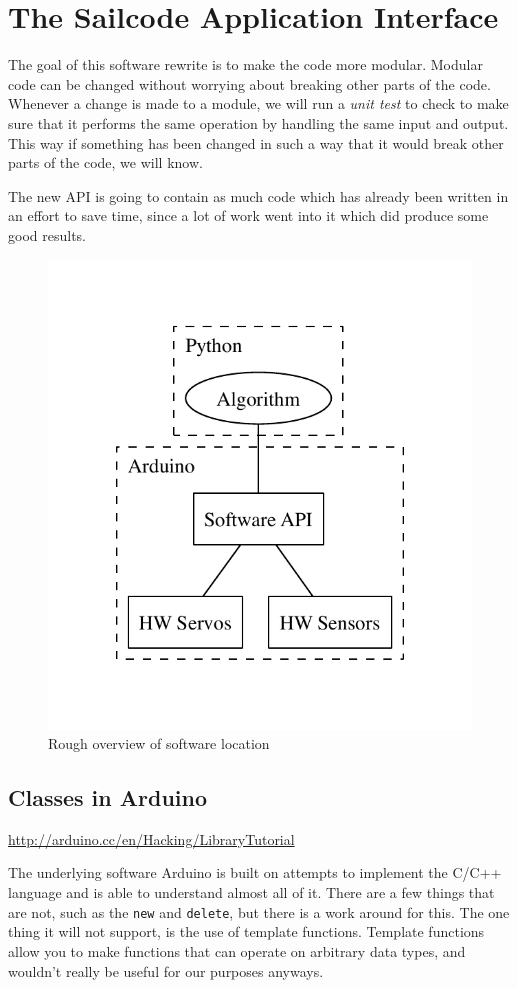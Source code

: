 \documentclass[letterpaper]{article}
\begin{document}

%

\section{The Sailcode Application Interface} %
\label{sec:The Sailcode Application Interface}

The goal of this software rewrite is to make the code more modular. Modular code can be changed without worrying about breaking other parts of the code. Whenever a change is made to a module, we will run a \emph{unit test} to check to make sure that it performs the same operation by handling the same input and output. This way if something has been changed in such a way that it would break other parts of the code, we will know.

The new API is going to contain as much code which has already been written in an effort to save time, since a lot of work went into it which did produce some good results.

\begin{figure}[h]
	\centering
	\includegraphics[width=0.4\linewidth]{mindmap_test/overview.pdf}
	\caption{Rough overview of software location}
	\label{fig:overview}
\end{figure}


\subsection{Classes in Arduino} %
\label{sec:Classes in Arduino}

\url{http://arduino.cc/en/Hacking/LibraryTutorial}

The underlying software Arduino is built on attempts to implement the C/C++ language and is able to understand almost all of it. There are a few things that are not, such as the \verb+new+ and \verb+delete+, but there is a work around for this. The one thing it will not support, is the use of template functions. Template functions allow you to make functions that can operate on arbitrary data types, and wouldn't really be useful for our purposes anyways.
\end{document}
